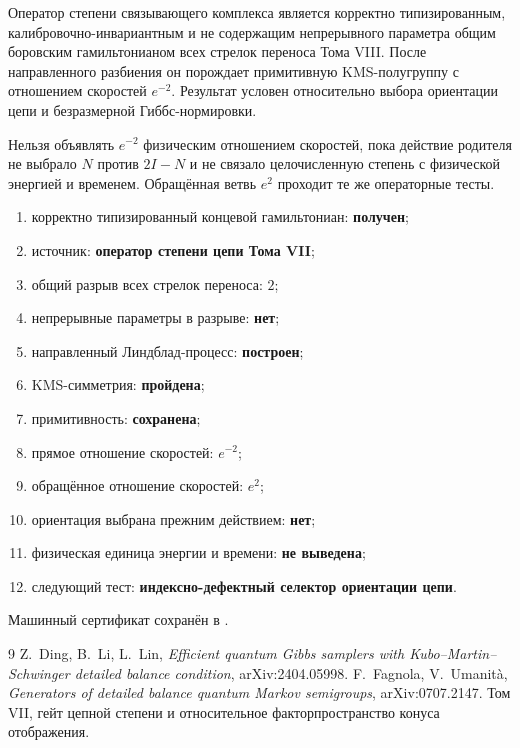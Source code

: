 \begin{theorem}
Оператор степени связывающего комплекса является корректно типизированным,
калибровочно-инвариантным и не содержащим непрерывного параметра общим боровским
гамильтонианом всех стрелок переноса Тома VIII. После направленного
разбиения он порождает примитивную KMS-полугруппу с отношением скоростей
$e^{-2}$. Результат условен относительно выбора ориентации цепи и
безразмерной Гиббс-нормировки.
\end{theorem}

\begin{nogocriterion}
Нельзя объявлять $e^{-2}$ физическим отношением скоростей, пока действие
родителя не выбрало $N$ против $2I-N$ и не связало целочисленную степень с
физической энергией и временем. Обращённая ветвь $e^2$ проходит те же
операторные тесты.
\end{nogocriterion}

\begin{protocol}
\begin{enumerate}
 \item корректно типизированный концевой гамильтониан: \textbf{получен};
 \item источник: \textbf{оператор степени цепи Тома VII};
 \item общий разрыв всех стрелок переноса: \textbf{$2$};
 \item непрерывные параметры в разрыве: \textbf{нет};
 \item направленный Линдблад-процесс: \textbf{построен};
 \item KMS-симметрия: \textbf{пройдена};
 \item примитивность: \textbf{сохранена};
 \item прямое отношение скоростей: \textbf{$e^{-2}$};
 \item обращённое отношение скоростей: \textbf{$e^2$};
 \item ориентация выбрана прежним действием: \textbf{нет};
 \item физическая единица энергии и времени: \textbf{не выведена};
 \item следующий тест: \textbf{индексно-дефектный селектор ориентации цепи}.
\end{enumerate}
\end{protocol}

Машинный сертификат сохранён в
.

\begin{thebibliography}{9}
Z.~Ding, B.~Li, L.~Lin,
\emph{Efficient quantum Gibbs samplers with Kubo--Martin--Schwinger
detailed balance condition}, arXiv:2404.05998.
F.~Fagnola, V.~Umanit\`a,
\emph{Generators of detailed balance quantum Markov semigroups},
arXiv:0707.2147.
Том VII, гейт цепной степени и относительное факторпространство конуса отображения.
\end{thebibliography}